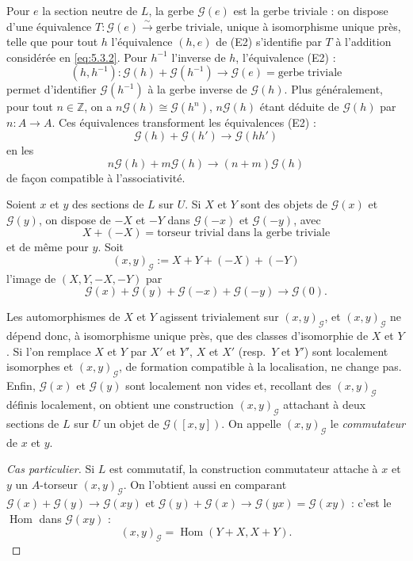 \documentclass[12pt,a4paper]{article}
\theoremstyle{plain}
\theoremstyle{definition}
\theoremstyle{remark}
\DeclareMathOperator{\Hom}{Hom}
\newcommand{\Z}{\mathbb{Z}}
\providecommand{\Hom}{\operatorname{Hom}}
\begin{document}
Pour $e$ la section neutre de $L$, la gerbe $\mathscr{G}(e)$ est la gerbe triviale : on dispose d'une
équivalence $T : \mathscr{G}(e) \xrightarrow{\sim} \text{gerbe triviale}$, unique à isomorphisme unique près, telle que
pour tout $h$ l'équivalence $(h, e)$ de (E2) s'identifie par $T$ à l'addition considérée en \eqref{eq:5.3.2}.
Pour $h^{-1}$ l'inverse de $h$, l'équivalence (E2) :
\[
(h, h^{-1}) : \mathscr{G}(h) + \mathscr{G}(h^{-1}) \to \mathscr{G}(e) = \text{gerbe triviale}
\]
permet d'identifier $\mathscr{G}(h^{-1})$ à la gerbe inverse de $\mathscr{G}(h)$. Plus généralement, pour tout
$n \in \Z$, on a $n\mathscr{G}(h) \cong \mathscr{G}(h^n)$, $n\mathscr{G}(h)$ étant déduite de $\mathscr{G}(h)$ par $n : A \to A$. Ces équivalences
transforment les équivalences (E2) :
\[
\mathscr{G}(h) + \mathscr{G}(h') \to \mathscr{G}(hh')
\]
en les
\[
n\mathscr{G}(h) + m\mathscr{G}(h) \to (n + m)\mathscr{G}(h)
\]
de façon compatible à l'associativité.

Soient $x$ et $y$ des sections de $L$ sur $U$. Si $X$ et $Y$ sont des objets de $\mathscr{G}(x)$ et $\mathscr{G}(y)$,
on dispose de $-X$ et $-Y$ dans $\mathscr{G}(-x)$ et $\mathscr{G}(-y)$, avec
\[
X + (-X) = \text{torseur trivial dans la gerbe triviale}
\]
et de même pour $y$. Soit
\[
(x,y)_\mathscr{G} := X + Y + (-X) + (-Y)
\]
l'image de $(X, Y, -X, -Y)$ par
\[
\mathscr{G}(x) + \mathscr{G}(y) + \mathscr{G}(-x) + \mathscr{G}(-y) \to \mathscr{G}(0).
\]

Les automorphismes de $X$ et $Y$ agissent trivialement sur $(x,y)_\mathscr{G}$, et $(x,y)_\mathscr{G}$ ne dépend
donc, à isomorphisme unique près, que des classes d'isomorphie de $X$ et $Y$. Si l'on remplace $X$ et $Y$ par $X'$ et $Y'$, $X$ et $X'$ (resp.~$Y$ et $Y'$) sont localement isomorphes et $(x,y)_\mathscr{G}$,
de formation compatible à la localisation, ne change pas. Enfin, $\mathscr{G}(x)$ et $\mathscr{G}(y)$ sont
localement non vides et, recollant des $(x,y)_\mathscr{G}$ définis localement, on obtient une construction $(x, y)_\mathscr{G}$ attachant à deux sections de $L$ sur $U$ un objet de $\mathscr{G}([x,y])$. On appelle
$(x,y)_\mathscr{G}$ le \emph{commutateur} de $x$ et $y$.

\begin{proof}[Cas particulier]
Si $L$ est commutatif, la construction commutateur attache à $x$
et $y$ un $A$-torseur $(x,y)_\mathscr{G}$. On l'obtient aussi en comparant $\mathscr{G}(x) + \mathscr{G}(y) \to \mathscr{G}(xy)$ et
$\mathscr{G}(y) + \mathscr{G}(x) \to \mathscr{G}(yx) = \mathscr{G}(xy)$ : c'est le $\Hom$ dans $\mathscr{G}(xy)$ :
\[
(x,y)_\mathscr{G} = \Hom(Y + X, X + Y).
\]
\end{proof}
\end{document}
